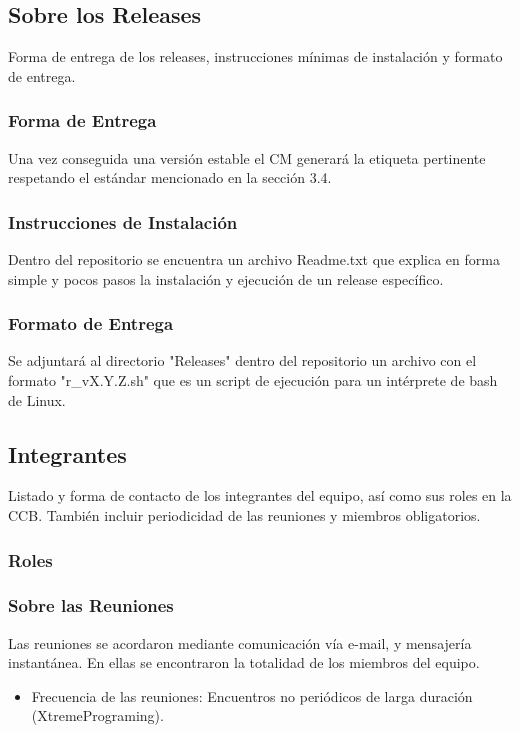 \documentclass[10pt]{article} %
\begin{document}
\subsection{Sobre los Releases}
Forma de entrega de los releases, instrucciones mínimas de instalación y formato de entrega.

\subsubsection{Forma de Entrega}
Una vez conseguida una versión estable el CM generará la etiqueta pertinente respetando el estándar mencionado en la sección 3.4.%

\subsubsection{Instrucciones de Instalación}
Dentro del repositorio se encuentra un archivo Readme.txt que explica en forma simple y pocos pasos la instalación y ejecución de un release específico.

\subsubsection{Formato de Entrega}
Se adjuntará al directorio "Releases" dentro del repositorio un archivo con el formato "r\_vX.Y.Z.sh" que es un script de ejecución para un intérprete de bash de Linux.

\subsection{Integrantes}
Listado y forma de contacto de los integrantes del equipo, así como sus roles en la CCB. También incluir periodicidad de las reuniones y miembros obligatorios.
\subsubsection{Roles}


\subsubsection{Sobre las Reuniones}
Las reuniones se acordaron mediante comunicación vía e-mail, y mensajería instantánea. En ellas se encontraron la totalidad de los miembros del equipo.
\begin{itemize}
\item Frecuencia de las reuniones: Encuentros no periódicos de larga duración (XtremePrograming).
\end{itemize}
\end{document}
